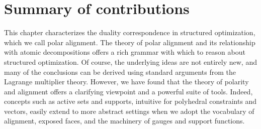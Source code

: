 \section{Summary of contributions} \label{sec:conclusions}

This chapter characterizes the duality correspondence in structured optimization, which we call polar alignment. The theory of polar alignment and its relationship with atomic decompositions offers a rich grammar with which to reason about structured optimization. Of course, the underlying ideas are not entirely new, and many of the conclusions
can be derived using standard arguments from the Lagrange multiplier theory.
However, we have found that the theory of polarity and alignment offers a
clarifying viewpoint and a powerful suite of tools. Indeed, concepts such as
active sets and supports, intuitive for polyhedral constraints and
vectors, easily extend to more abstract settings when we adopt the vocabulary of
alignment, exposed faces, and the machinery of gauges and support functions. 











